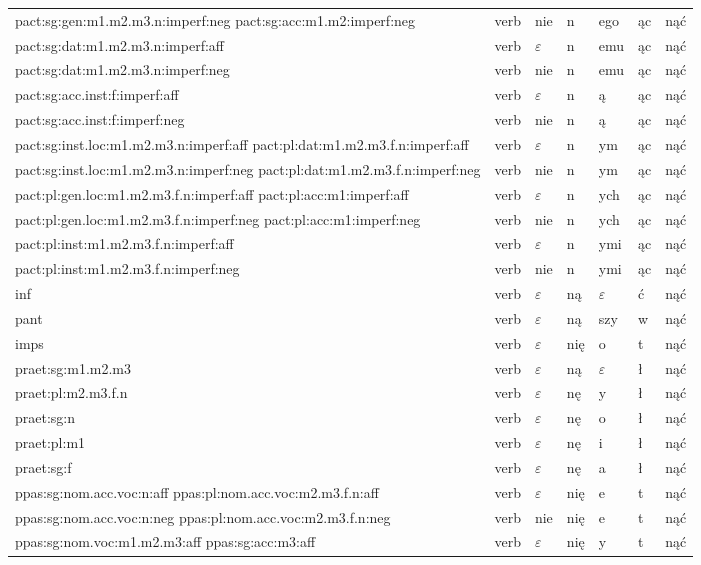 \documentclass{article}
\begin{document}
\begin{longtable}{p{7cm}|l|l|l|l|l|l}
pact:sg:gen:m1.m2.m3.n:imperf:neg pact:sg:acc:m1.m2:imperf:neg & verb & nie & n & ego & ąc & nąć\\
pact:sg:dat:m1.m2.m3.n:imperf:aff & verb & $\varepsilon$ & n & emu & ąc & nąć\\
pact:sg:dat:m1.m2.m3.n:imperf:neg & verb & nie & n & emu & ąc & nąć\\
pact:sg:acc.inst:f:imperf:aff & verb & $\varepsilon$ & n & ą & ąc & nąć\\
pact:sg:acc.inst:f:imperf:neg & verb & nie & n & ą & ąc & nąć\\
pact:sg:inst.loc:m1.m2.m3.n:imperf:aff pact:pl:dat:m1.m2.m3.f.n:imperf:aff & verb & $\varepsilon$ & n & ym & ąc & nąć\\
pact:sg:inst.loc:m1.m2.m3.n:imperf:neg pact:pl:dat:m1.m2.m3.f.n:imperf:neg & verb & nie & n & ym & ąc & nąć\\
pact:pl:gen.loc:m1.m2.m3.f.n:imperf:aff pact:pl:acc:m1:imperf:aff & verb & $\varepsilon$ & n & ych & ąc & nąć\\
pact:pl:gen.loc:m1.m2.m3.f.n:imperf:neg pact:pl:acc:m1:imperf:neg & verb & nie & n & ych & ąc & nąć\\
pact:pl:inst:m1.m2.m3.f.n:imperf:aff & verb & $\varepsilon$ & n & ymi & ąc & nąć\\
pact:pl:inst:m1.m2.m3.f.n:imperf:neg & verb & nie & n & ymi & ąc & nąć\\
inf & verb & $\varepsilon$ & ną & $\varepsilon$ & ć & nąć\\
pant & verb & $\varepsilon$ & ną & szy & w & nąć\\
imps & verb & $\varepsilon$ & nię & o & t & nąć\\
praet:sg:m1.m2.m3 & verb & $\varepsilon$ & ną & $\varepsilon$ & ł & nąć\\
praet:pl:m2.m3.f.n & verb & $\varepsilon$ & nę & y & ł & nąć\\
praet:sg:n & verb & $\varepsilon$ & nę & o & ł & nąć\\
praet:pl:m1 & verb & $\varepsilon$ & nę & i & ł & nąć\\
praet:sg:f & verb & $\varepsilon$ & nę & a & ł & nąć\\
ppas:sg:nom.acc.voc:n:aff ppas:pl:nom.acc.voc:m2.m3.f.n:aff & verb & $\varepsilon$ & nię & e & t & nąć\\
ppas:sg:nom.acc.voc:n:neg ppas:pl:nom.acc.voc:m2.m3.f.n:neg & verb & nie & nię & e & t & nąć\\
ppas:sg:nom.voc:m1.m2.m3:aff ppas:sg:acc:m3:aff & verb & $\varepsilon$ & nię & y & t & nąć\\

\end{longtable}
\end{document}
